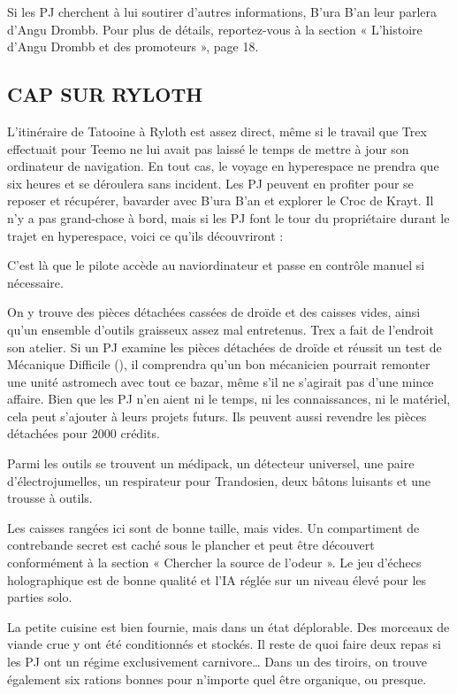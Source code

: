 \documentclass[a4paper,10pt,twoside,twocolumn,openany]{book}
\begin{document}
Si les PJ cherchent à lui soutirer d’autres informations, B’ura B’an leur parlera d’Angu Drombb. Pour plus de détails, reportez-vous à la section « L’histoire d’Angu
Drombb et des promoteurs », page 18.

\subsection{CAP SUR RYLOTH}

L’itinéraire de Tatooine à Ryloth est assez direct, même
si le travail que Trex effectuait pour Teemo ne lui avait
pas laissé le temps de mettre à jour son ordinateur de
navigation. En tout cas, le voyage en hyperespace ne
prendra que six heures et se déroulera sans incident.
Les PJ peuvent en profiter pour se reposer et récupérer,
bavarder avec B’ura B’an et explorer le Croc de Krayt. Il
n’y a pas grand-chose à bord, mais si les PJ font le tour
du propriétaire durant le trajet en hyperespace, voici ce
qu’ils découvriront :

\subtitle{COCKPIT}
C’est là que le pilote accède au naviordinateur et passe
en contrôle manuel si nécessaire.

\subtitle{SOUTE 2}
On y trouve des pièces détachées cassées de droïde et
des caisses vides, ainsi qu’un ensemble d’outils graisseux
assez mal entretenus. Trex a fait de l’endroit son atelier.
Si un PJ examine les pièces détachées de droïde et réussit un test de Mécanique Difficile (\difficulty \difficulty \difficulty), il comprendra qu’un bon mécanicien pourrait remonter une unité
astromech avec tout ce bazar, même s’il ne s’agirait pas
d’une mince affaire. Bien que les PJ n’en aient ni le temps,
ni les connaissances, ni le matériel, cela peut s’ajouter à
leurs projets futurs. Ils peuvent aussi revendre les pièces
détachées pour 2000 crédits.

Parmi les outils se trouvent un médipack, un détecteur universel, une paire d’électrojumelles, un respirateur pour Trandosien, deux bâtons luisants et une
trousse à outils.

\subtitle{SOUTE PRINCIPALE}
Les caisses rangées ici sont de bonne taille, mais vides.
Un compartiment de contrebande secret est caché sous
le plancher et peut être découvert conformément à la
section « Chercher la source de l’odeur ». Le jeu d’échecs
holographique est de bonne qualité et l’IA réglée sur un
niveau élevé pour les parties solo.

\subtitle{CUISINE}

La petite cuisine est bien fournie, mais dans un état
déplorable. Des morceaux de viande crue y ont été
conditionnés et stockés. Il reste de quoi faire deux repas
si les PJ ont un régime exclusivement carnivore… Dans
un des tiroirs, on trouve également six rations bonnes
pour n’importe quel être organique, ou presque.
\end{document}
